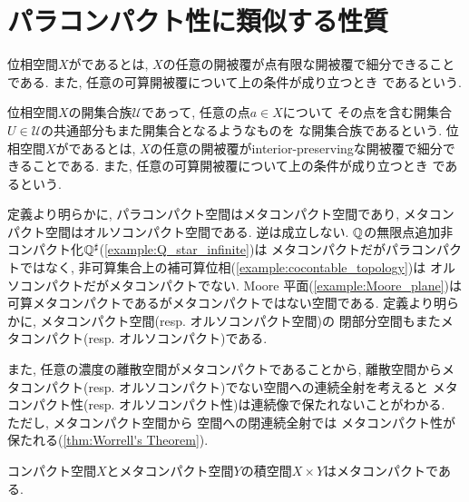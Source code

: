 \documentclass[uplatex, dvipdfmx, a4paper, 12pt, class=jsbook, crop=false]{standalone}
\begin{document}
\section{パラコンパクト性に類似する性質}
\label{sec:paracompact-like-properties}
\newcommand{\imgto}{{}\triangleright{}}
\newcommand{\imgot}{{}\triangleleft{}}

\begin{definition}
	位相空間$ X $がであるとは, 
	$ X $の任意の開被覆が点有限な開被覆で細分できることである.
	また, 任意の可算開被覆について上の条件が成り立つとき
	であるという.
\end{definition}

\begin{definition}
	位相空間$ X $の開集合族$ \mathscr{U} $であって, 任意の点$ a \in X $について
	その点を含む開集合$ U \in \mathscr{U} $の共通部分もまた開集合となるようなものを
	な開集合族であるという.
	位相空間$ X $がであるとは, 
	$ X $の任意の開被覆がinterior-preservingな開被覆で細分できることである. 
	また, 任意の可算開被覆について上の条件が成り立つとき
	であるという.
\end{definition}

定義より明らかに, パラコンパクト空間はメタコンパクト空間であり, メタコンパクト空間はオルソコンパクト空間である. 
逆は成立しない. $ \mathbb{Q} $の無限点追加非コンパクト化$ \mathbb{Q}^\sharp $(\cref{example:Q_star_infinite})は
メタコンパクトだがパラコンパクトではなく, 非可算集合上の補可算位相(\cref{example:cocontable_topology})は
オルソコンパクトだがメタコンパクトでない. 
Moore 平面(\cref{example:Moore_plane})は可算メタコンパクトであるがメタコンパクトではない空間である. 
定義より明らかに, メタコンパクト空間(resp. オルソコンパクト空間)の
閉部分空間もまたメタコンパクト(resp. オルソコンパクト)である. 

また, 任意の濃度の離散空間がメタコンパクトであることから, 
離散空間からメタコンパクト(resp. オルソコンパクト)でない空間への連続全射を考えると
メタコンパクト性(resp. オルソコンパクト性)は連続像で保たれないことがわかる.　
ただし, メタコンパクト空間から \Hausdorff 空間への閉連続全射では
メタコンパクト性が保たれる(\cref{thm:Worrell's Theorem}).

\begin{proposition}
	\label{prop: A product space of a compact space X and a metacompact space Y is metacompact}
	コンパクト空間$ X $とメタコンパクト空間$ Y $の積空間$ X \times Y $はメタコンパクトである.
\end{proposition}
\end{document}
